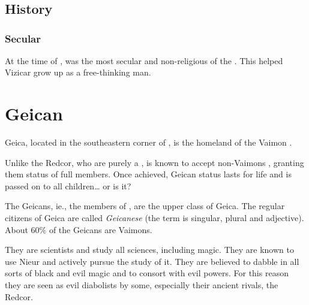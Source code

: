 \section{\Delaen}









\subsection{History}





\subsubsection{Secular}
At the time of , \ClanDelaen was the most secular and non-religious of the \VaimonClans.
This helped Vizicar grow up as a free-thinking man. 















\section{Geican}
Geica, located in the southeastern corner of \Velcad{}, is the homeland of the Vaimon \ClanGeican. 

Unlike the Redcor, who are purely a \VaimonClan, \ClanGeican is known to accept non-Vaimons , granting them status of full \vclan members. Once achieved, Geican status lasts for life and is passed on to all children\ldots{} or is it? 

The Geicans, ie., the members of \ClanGeican, are the upper class of Geica. The regular citizens of Geica are called \emph{Geicanese} (the term is singular, plural and adjective). About $60\%$ of the Geicans are Vaimons. 

They are scientists and study all sciences, including magic. They are known to use Nieur and actively pursue the study of it. 
They are believed to dabble in all sorts of black and evil magic and to consort with evil powers. 
For this reason they are seen as evil diabolists by some, especially their ancient rivals, the Redcor. 









